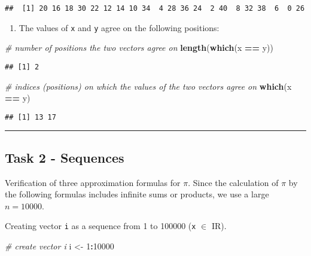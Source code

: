 \documentclass[
]{article}
\newenvironment{Shaded}{\begin{snugshade}}{\end{snugshade}}
\newcommand{\CommentTok}[1]{\textcolor[rgb]{0.56,0.35,0.01}{\textit{#1}}}
\newcommand{\DecValTok}[1]{\textcolor[rgb]{0.00,0.00,0.81}{#1}}
\newcommand{\KeywordTok}[1]{\textcolor[rgb]{0.13,0.29,0.53}{\textbf{#1}}}
\newcommand{\NormalTok}[1]{#1}
\newcommand{\OperatorTok}[1]{\textcolor[rgb]{0.81,0.36,0.00}{\textbf{#1}}}
\newcommand{\StringTok}[1]{\textcolor[rgb]{0.31,0.60,0.02}{#1}}
\providecommand{\tightlist}{%
  \setlength{\itemsep}{0pt}\setlength{\parskip}{0pt}}
\begin{document}
\begin{verbatim}
##  [1] 20 16 18 30 22 12 14 10 34  4 28 36 24  2 40  8 32 38  6  0 26
\end{verbatim}

\begin{enumerate}
\def\labelenumi{\arabic{enumi}.}
\setcounter{enumi}{2}
\tightlist
\item
  The values of \texttt{x} and \texttt{y} agree on the following
  positions:
\end{enumerate}

\begin{Shaded}
\begin{Highlighting}[]
\CommentTok{# number of positions the two vectors agree on}
\KeywordTok{length}\NormalTok{(}\KeywordTok{which}\NormalTok{(x }\OperatorTok{==}\StringTok{ }\NormalTok{y))}
\end{Highlighting}
\end{Shaded}

\begin{verbatim}
## [1] 2
\end{verbatim}

\begin{Shaded}
\begin{Highlighting}[]
\CommentTok{# indices (positions) on which the values of the two vectors agree on}
\KeywordTok{which}\NormalTok{(x }\OperatorTok{==}\StringTok{ }\NormalTok{y)}
\end{Highlighting}
\end{Shaded}

\begin{verbatim}
## [1] 13 17
\end{verbatim}

\begin{center}\rule{0.5\linewidth}{0.5pt}\end{center}

\hypertarget{task-2---sequences}{%
\subsection{Task 2 - Sequences}\label{task-2---sequences}}

Verification of three approximation formulas for \(\pi\). Since the
calculation of \(\pi\) by the following formulas includes infinite sums
or products, we use a large \(n = 10000\).

Creating vector \texttt{i} as a sequence from 1 to 100000 (\texttt{x}
\(\in\) \rm I\!R).

\begin{Shaded}
\begin{Highlighting}[]
\CommentTok{# create vector i}
\NormalTok{i <-}\StringTok{ }\DecValTok{1}\OperatorTok{:}\DecValTok{10000}
\end{Highlighting}
\end{Shaded}
\end{document}
